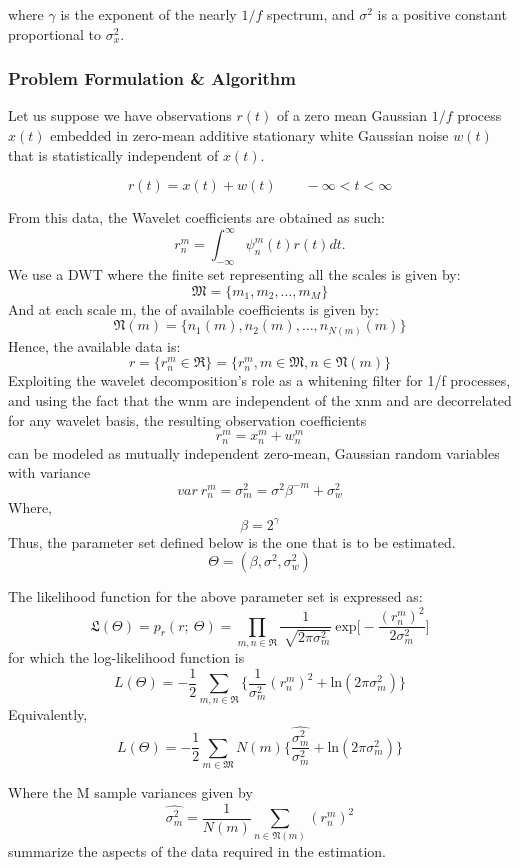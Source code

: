 \documentclass[a4paper]{article}
\begin{document}
where $\gamma$ is the exponent of the nearly $1/f$ spectrum, and $\sigma^2$ is a positive constant proportional to $\sigma_x^2$.

\subsubsection{Problem Formulation \& Algorithm}

Let us suppose we have observations $r(t)$ of a zero mean Gaussian $1/f$ process $x(t)$ embedded in zero-mean additive stationary white Gaussian noise $w(t)$ that is statistically independent of $x(t)$.

$$r(t) = x(t) + w(t)\qquad -\infty<t<\infty $$

From this data, the Wavelet coefficients are obtained as such:
$$ r_n^m = \int_{-\infty} ^\infty \psi_n^m(t)r(t)dt.$$
We use a DWT where the finite set representing all the scales is given by:
$$\mathfrak{M} = \{ m_1,m_2,\ldots, m_M \} $$
And at each scale m, the of available coefficients is given by:
$$\mathfrak{N}(m) = \{ n_1(m),n_2(m),\ldots, n_{N(m)}(m) \} $$
Hence, the available data is:
$$r = \{ r_n^m \in \mathfrak{R}\} = \{ r_n^m, m\in \mathfrak{M},n\in \mathfrak{N}(m) \} $$
Exploiting the wavelet decomposition’s role as a whitening filter for 1/f processes, and using the fact that the wnm are independent of the xnm and are decorrelated for any wavelet basis, the resulting observation coefficients
$$r_n^m = x_n^m + w_n^m $$
can be modeled as mutually independent zero-mean, Gaussian random variables with variance
$$var\ r_n^m = \sigma^2_m =\sigma^2 \beta^{-m} + \sigma^2_w$$
Where,
$$\beta = 2^\gamma $$
Thus, the parameter set defined below is the one that is to be estimated.
$$\Theta = (\beta , \sigma^2, \sigma^2_w)$$

The likelihood function for the above parameter set is expressed as:
$$\mathfrak{L}(\Theta) = p_r(r;\ \Theta) = \prod _{m,n\in \mathfrak{R}} \frac{1}{\sqrt[]{2\pi \sigma _m^2}}\ \text{exp} \bigg [-\frac{(r_n^m)^2}{2\sigma^2_m}\bigg]$$
for which the log-likelihood function is
$$L(\Theta) = -\frac{1}{2}\sum_{m,n\in \mathfrak{R}}\bigg \{ \frac{1}{\sigma_m^2}(r_n^m)^2+ \text{ln} (2 \pi \sigma_m^2 ) \bigg \}  $$
Equivalently,
$$L(\Theta) = -\frac{1}{2}\sum_{m \in \mathfrak{M}}N(m)\bigg \{ \frac{\hat{\sigma_m^2}}{\sigma_m^2}+ \text{ln} (2 \pi \sigma_m^2 ) \bigg \}  $$

Where the M sample variances given by
$$\hat{\sigma_m^2} = \frac{1}{N(m)} \sum_{n \in \mathfrak{N}(m)}(r_n^m)^2 $$
summarize the aspects of the data required in the estimation.
\end{document}
